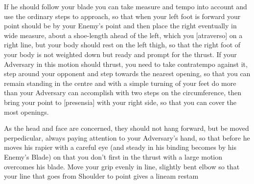 
If he should follow your blade you can take measure and tempo into
account and use the ordinary steps to approach, so that when your left
foot is forward your point should be by your Enemy's point and then
place the right eventually in wide measure, about a shoe-length
ahead of the left, which you [atraverso] on a right
line, but your body should rest on the left thigh, so that the right
foot of your body is not weighted down but ready and prompt for the
thrust. If your Adversary in this motion should thrust, you need to
take contratempo against it, step around your opponent and step
towards the nearest opening, so that you can remain standing in the
centre and with a simple turning of your feet do more than your
Adversary can accomplish with two steps on the circumference, then
bring your point to [presensia] with your right side, so that you can
cover the most openings.


As the head and face are concerned, they should not hang forward, but
be moved perpedicular, always paying attention to your Adversary's
hand, so that before he moves his rapier with a careful eye (and
steady in his binding becomes by his Enemy's Blade) on that you
don't first in the thrust with a large motion overcomes his
blade. Move your grip evenly in line, slightly bent elbow so that your
line that goes from Shoulder to point gives a lineam restam